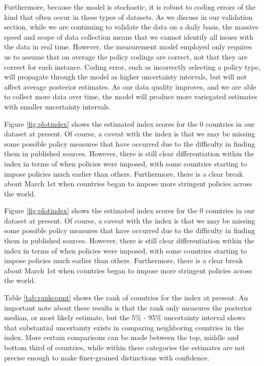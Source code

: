 \documentclass[]{article}
\begin{document}
Furthermore, because the model is stochastic, it is robust to coding errors of the kind that often occur in these types of datasets. As we discuss in our validation section, while we are continuing to validate the data on a daily basis, the massive speed and scope of data collection means that we cannot identify all issues with the data in real time. However, the measurement model employed only requires us to assume that on average the policy codings are correct, not that they are correct for each instance. Coding error, such as incorrectly selecting a policy type, will propagate through the model as higher uncertainty intervals, but will not affect average posterior estimates. As our data quality improves, and we are able to collect more data over time, the model will produce more variegated estimates with smaller uncertainty intervals.

Figure \ref{fig:plotindex} shows the estimated index scores for the 0 countries in our dataset at present. Of course, a caveat with the index is that we may be missing some possible policy measures that have occurred due to the difficulty in finding them in published sources. However, there is still clear differentiation within the index in terms of when policies were imposed, with some countries starting to impose policies much earlier than others. Furthermore, there is a clear break about March 1st when countries began to impose more stringent policies across the world.

Figure \ref{fig:plotindex} shows the estimated index scores for the 0 countries in our dataset at present. Of course, a caveat with the index is that we may be missing some possible policy measures that have occurred due to the difficulty in finding them in published sources. However, there is still clear differentiation within the index in terms of when policies were imposed, with some countries starting to impose policies much earlier than others. Furthermore, there is a clear break about March 1st when countries began to impose more stringent policies across the world.

Table \ref{tab:rankcount} shows the rank of countries for the index at present. An important note about these results is that the rank only measures the posterior median, or most likely estimate, but the 5\% - 95\% uncertainty interval shows that substantial uncertainty exists in comparing neighboring countries in the index. More certain comparisons can be made between the top, middle and bottom third of countries, while within these categories the estimates are not precise enough to make finer-grained distinctions with confidence.
\end{document}
